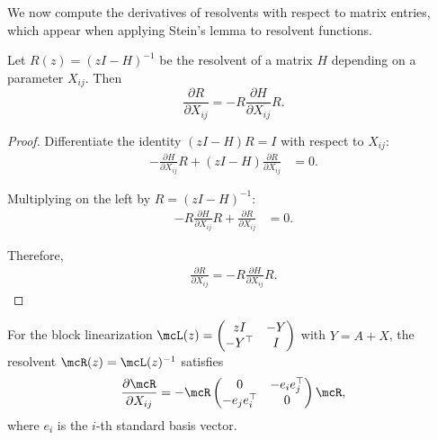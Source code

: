 We now compute the derivatives of resolvents with respect to matrix entries, which appear when applying Stein's lemma to resolvent functions.

\begin{lemma}\label{lem:resolvent-derivative}
Let $R(z) = (zI - H)^{-1}$ be the resolvent of a matrix $H$ depending on a parameter $X_{ij}$. Then
\begin{equation}\label{eq:resolvent-derivative}
\frac{\partial R}{\partial X_{ij}} = -R \frac{\partial H}{\partial X_{ij}} R.
\end{equation}
\end{lemma}

\begin{proof}
Differentiate the identity $(zI - H) R = I$ with respect to $X_{ij}$:
\begin{align}
-\frac{\partial H}{\partial X_{ij}} R + (zI - H) \frac{\partial R}{\partial X_{ij}} &= 0.
\end{align}

Multiplying on the left by $R = (zI - H)^{-1}$:
\begin{align}
-R \frac{\partial H}{\partial X_{ij}} R + \frac{\partial R}{\partial X_{ij}} &= 0.
\end{align}

Therefore,
\begin{align}
\frac{\partial R}{\partial X_{ij}} = -R \frac{\partial H}{\partial X_{ij}} R.
\end{align}
\end{proof}

\begin{proposition}\label{prop:block-resolvent-derivative}
For the block linearization $\mcL(z) = \begin{pmatrix} zI & -Y \\ -Y^\top & I \end{pmatrix}$ with $Y = A + X$, the resolvent $\mcR(z) = \mcL(z)^{-1}$ satisfies
\begin{equation}\label{eq:block-resolvent-derivative}
\frac{\partial \mcR}{\partial X_{ij}} = -\mcR \begin{pmatrix} 0 & -e_i e_j^\top \\ -e_j e_i^\top & 0 \end{pmatrix} \mcR,
\end{equation}
where $e_i$ is the $i$-th standard basis vector.
\end{proposition}

